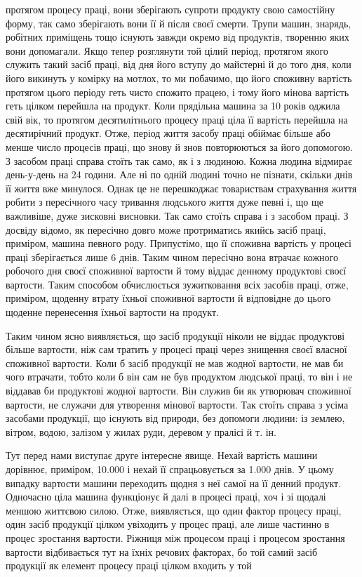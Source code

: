 \parcont{}  %
протягом процесу праці, вони зберігають супроти продукту свою
самостійну форму, так само зберігають вони її й після своєї смерти.
Трупи машин, знарядь, робітних приміщень тощо існують завжди
окремо від продуктів, творенню яких вони допомагали. Якщо
тепер розглянути той цілий період, протягом якого служить такий
засіб праці, від дня його вступу до майстерні й до того дня, коли
його викинуть у комірку на мотлох, то ми побачимо, що його
споживну вартість протягом цього періоду геть чисто спожито
працею, і тому його мінова вартість геть цілком перейшла на
продукт. Коли прядільна машина за 10 років оджила свій вік,
то протягом десятилітнього процесу праці ціла її вартість перейшла
на десятирічний продукт. Отже, період життя засобу праці
обіймає більше або менше число процесів праці, що знову й знов
повторюються за його допомогою. З засобом праці справа стоїть
так само, як і з людиною. Кожна людина відмирає день-у-день
на 24 години. Але ні по одній людині точно не пізнати, скільки
днів її життя вже минулося. Однак це не перешкоджає товариствам
страхування життя робити з пересічного часу тривання людського
життя дуже певні і, що ще важливіше, дуже зисковні висновки.
Так само стоїть справа і з засобом праці. З досвіду відомо, як
пересічно довго може протриматись якийсь засіб праці, приміром,
машина певного роду. Припустімо, що її споживна вартість у
процесі праці зберігається лише 6 днів. Таким чином пересічно
вона втрачає кожного робочого дня  своєї споживної вартости
й тому віддає денному продуктові  своєї вартости. Таким способом
обчислюється зужитковання всіх засобів праці, отже,
приміром, щоденну втрату їхньої споживної вартости й відповідне
до цього щоденне перенесення їхньої вартости на продукт.

Таким чином ясно виявляється, що засіб продукції ніколи не
віддає продуктові більше вартости, ніж сам тратить у процесі
праці через знищення своєї власної споживної вартости. Коли б
засіб продукції не мав жодної вартости, не мав би чого втрачати,
тобто коли б він сам не був продуктом людської праці, то він і
не віддавав би продуктові жодної вартости. Він служив би як
утворювач споживної вартости, не служачи для утворення мінової
вартости. Так стоїть справа з усіма засобами продукції, що
існують від природи, без допомоги людини: із землею, вітром,
водою, залізом у жилах руди, деревом у пралісі й т. ін.

Тут перед нами виступає друге інтересне явище. Нехай вартість
машини дорівнює, приміром, \num{10.000}
і нехай її спрацьовується за \num{1.000} днів. У цьому випадку  вартости
машини переходить щодня з неї самої на її денний продукт.
Одночасно ціла машина функціонує й далі в процесі праці, хоч
і зі щодалі меншою життєвою силою. Отже, виявляється, що
один фактор процесу праці, один засіб продукції цілком увіходить
у процес праці, але лише частинно в процес зростання вартости.
Ріжниця між процесом праці і процесом зростання вартости
відбивається тут на їхніх речових факторах, бо той самий
засіб продукції як елемент процесу праці цілком входить у той
\parbreak{}  %
